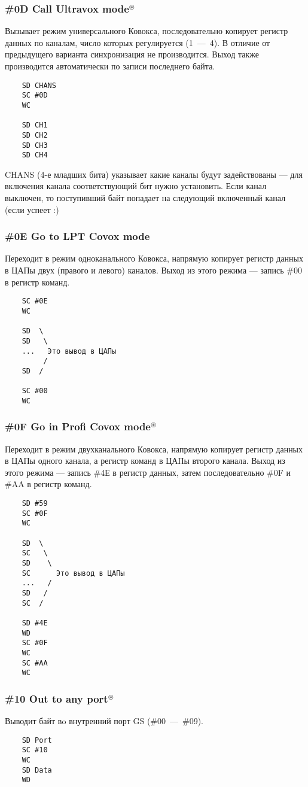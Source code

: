 \documentclass[a4paper,11pt]{article}
\DeclareRobustCommand{\Cyrax}{\texorpdfstring{\(^\circledast\)}{\circledast}}
\begin{document}
\subsubsection{\#0D Call Ultravox mode\Cyrax}
Вызывает режим универсального Ковокса, последовательно копирует регистр данных по каналам, число которых регулируется (1~---~4). В отличие от предыдущего варианта синхронизация не производится. Выход также производится автоматически по записи последнего байта.
\begin{verbatim}
    SD CHANS
    SC #0D
    WC

    SD CH1
    SD CH2
    SD CH3
    SD CH4
\end{verbatim}

CHANS (4-е младших бита) указывает какие каналы будут задействованы --- для включения канала соответствующий бит нужно установить. Если канал выключен, то поступивший байт попадает на следующий включенный канал (если успеет :)

\subsubsection{\#0E Go to LPT Covox mode}
Переходит в режим одноканального Ковокса, напрямую копирует регистр данных в ЦАПы двух (правого и левого) каналов. Выход из этого режима ---  запись \#00 в регистр команд.
\begin{verbatim}
    SC #0E
    WC

    SD  \
    SD   \
    ...   Это вывод в ЦАПы
         /
    SD  /

    SC #00
    WC
\end{verbatim}

\subsubsection{\#0F Go in Profi Covox mode\Cyrax}
Переходит в режим двухканального Ковокса, напрямую копирует регистр данных в ЦАПы одного канала, а регистр команд в ЦАПы второго канала. Выход из этого режима --- запись \#4Е в регистр данных, затем последовательно \#0F и \#AA в регистр команд.
\begin{verbatim}
    SD #59
    SC #0F
    WC

    SD  \
    SC   \
    SD    \
    SC      Это вывод в ЦАПы
    ...   /
    SD   /
    SC  /

    SD #4E
    WD
    SC #0F
    WC
    SC #AA
    WC
\end{verbatim}

\subsubsection{\#10 Out to any port\Cyrax}
Выводит байт вo внутренний порт GS (\#00~---~\#09).
\begin{verbatim}
    SD Port
    SC #10
    WC
    SD Data
    WD
\end{verbatim}
\end{document}
